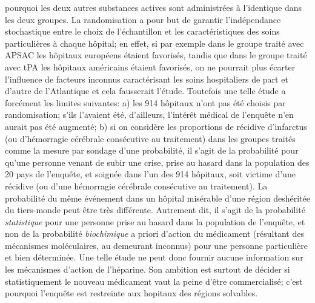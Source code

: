 {{{pourquoi les deux autres substances actives sont administr\'ees \`a 
l'identique dans les deux groupes. La randomisation a pour but de 
garantir l'ind\'ependance stochastique entre le choix de l'\'echantillon 
et les caract\'eristiques des soins particuli\`eres \`a chaque h\^opital; 
en effet, si par exemple dans le groupe trait\'e avec APSAC les 
h\^opitaux europ\'eens \'etaient favoris\'es, tandis que dans le groupe 
trait\'e avec tPA les h\^opitaux am\'ericains \'etaient favoris\'es, on ne 
pourrait plus \'ecarter l'influence de facteurs inconnus caract\'erisant 
les soins hospitaliers de part et d'autre de l'Atlantique et cela 
fausserait l'\'etude. 
\smallskip 
Toutefois une telle \'etude a forc\'ement les limites suivantes: 
\vskip2pt 
a) les 914 h\^opitaux n'ont pas \'et\'e choisis par randomisation; s'ils 
l'avaient \'et\'e, d'ailleurs, l'int\'er\^et m\'edical de l'enqu\^ete n'en
aurait pas \'et\'e augment\'e; 
\vskip2pt 
b) si on consid\`ere les proportions de r\'ecidive d'infarctus (ou 
d'h\'emorragie c\'er\'ebrale cons\'ecutive au traitement) dans les 
groupes trait\'es comme la mesure par sondage d'une probabilit\'e, il 
s'agit de la probabilit\'e pour qu'une personne venant de subir une crise, 
prise au hasard dans la population des 20 pays de l'enqu\^ete, et 
soign\'ee dans l'un des 914 h\^opitaux, soit victime d'une r\'ecidive (ou 
d'une h\'emorragie c\'er\'ebrale cons\'ecutive au traitement). La 
probabilit\'e du m\^eme \'ev\'enement dans un h\^opital mis\'erable 
d'une r\'egion desh\'erit\'ee du tiers-monde peut \^etre tr\`es 
diff\'erente. Autrement dit, il s'agit de la probabilit\'e {\it statistique} 
pour une personne prise au hasard dans la population de l'enqu\^ete, et 
non de la probabilit\'e {\it biochimique} a priori d'action du
m\'edicament (r\'esultant des m\'ecanismes mol\'eculaires, au 
demeurant inconnus) pour une personne particuli\`ere et bien 
d\'etermin\'ee. Une telle \'etude ne peut donc fournir aucune 
information sur les m\'ecanismes d'action de l'h\'eparine. Son ambition 
est surtout de d\'ecider si statistiquement le nouveau m\'edicament 
vaut la peine d'\^etre commercialis\'e; c'est pourquoi l'enqu\^ete est 
restreinte aux hopitaux des r\'egions solvables. \par }    } \vfill  }
\endinsert 
 
